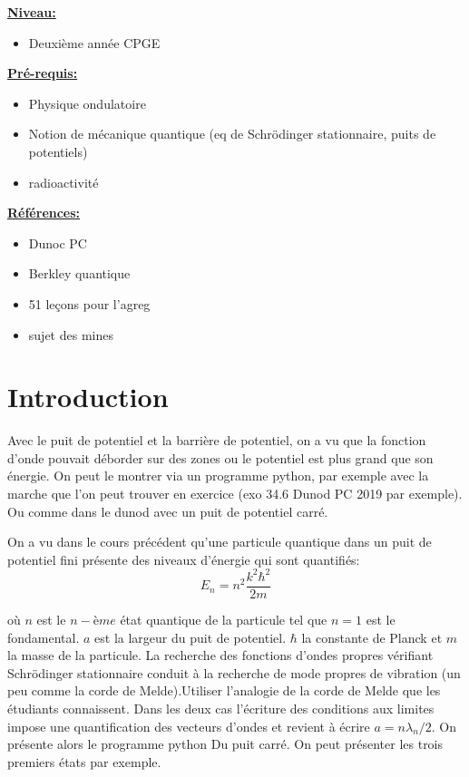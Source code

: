 \documentclass[french, a4paper, 10pt, twocolumn, landscape]{article}
\begin{document}
\noindent\underline{\textbf{Niveau:}} 
\begin{itemize}
    \item Deuxième année CPGE
\end{itemize}

\noindent\underline{\textbf{Pré-requis:}}
\begin{itemize}
    \item Physique ondulatoire
    \item Notion de mécanique quantique (eq de Schrödinger stationnaire, puits de potentiels)
    \item radioactivité
\end{itemize}

\noindent\underline{\textbf{Références:}}

\begin{itemize}
    \item Dunoc PC 
    \item Berkley quantique
    \item 51 leçons pour l'agreg
    \item sujet des mines
\end{itemize}

\hrulefill


\section*{Introduction}

Avec le puit de potentiel et la barrière de potentiel, on a vu que la fonction d'onde pouvait déborder sur des zones ou le potentiel est plus grand que son énergie. On peut le montrer via un programme python, par exemple avec la marche que l'on peut trouver en exercice (exo 34.6 Dunod PC 2019 par exemple). Ou comme dans le dunod avec un puit de potentiel carré.\medskip

On a vu dans le cours précédent qu'une particule quantique dans un puit de potentiel fini présente des niveaux d'énergie qui sont quantifiés:
\begin{equation}
    E_n = n^2\dfrac{k^2\hbar^2}{2m}
\end{equation}

où $n$ est le $n-ème$ état quantique de la particule tel que $n=1$ est le fondamental. $a$ est la largeur du puit de potentiel. $\hbar$ la constante de Planck et $m$ la masse de la particule. La recherche des fonctions d'ondes propres vérifiant Schrödinger stationnaire conduit à la recherche de mode propres de vibration (un peu comme la corde de Melde).Utiliser l'analogie de la corde de Melde que les étudiants connaissent.  Dans les deux cas l'écriture des conditions aux limites impose une quantification des vecteurs d'ondes  et revient à écrire $a=n\lambda_n/2$.  On présente alors le programme python Du puit carré. On peut présenter les trois premiers états par exemple.\medskip
\end{document}
